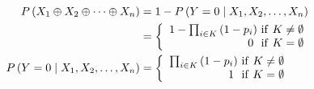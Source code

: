 \documentclass{article}
\numberwithin{equation}{section}
\numberwithin{figure}{section}
\numberwithin{table}{section}
\begin{document}
\begin{equation}
\begin{split}
P\left(X_1\oplus X_2\oplus \dots \oplus X_n\right)&=1-P\left(Y=0\mathrel{\left|\vphantom{Y=0 X_1,X_2,\dots ,X_n}\right.\kern-\nulldelimiterspace}X_1,X_2,\dots ,X_n\right)\\
&=\left\{ \begin{array}{r}
1-\prod_{i\in K}{\left(1-p_i\right)}\ \mathrm{if}\ K\neq \emptyset  \\ 
0\ \ \mathrm{if}\ K=\emptyset  \end{array}
\right.\\
P\left(Y=0\mathrel{\left|\vphantom{Y=0 X_1,X_2,\dots ,X_n}\right.\kern-\nulldelimiterspace}X_1,X_2,\dots ,X_n\right)&=\left\{ \begin{array}{r}
\prod_{i\in K}{\left(1-p_i\right)}\ \mathrm{if}\ K\neq \emptyset  \\ 
1\ \ \mathrm{if}\ K=\emptyset  \end{array}
\right.
\end{split}
\label{formula:or-gate-inference}
\end{equation}
\end{document}
